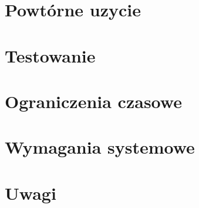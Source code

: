 \documentclass[a4paper,titlepage,10pt]{article}
\begin{document}
	\section{Powtórne uzycie}\label{sec:powtorne uzycie}
	
	\section{Testowanie}\label{sec:testy}
	
	\section{Ograniczenia czasowe}\label{sec:ograniczenia czasowe}
	
	\section{Wymagania systemowe}\label{sec:wymagania systemowe}
	
	\section{Uwagi}\label{sec:uwagi}
	
\end{document}
